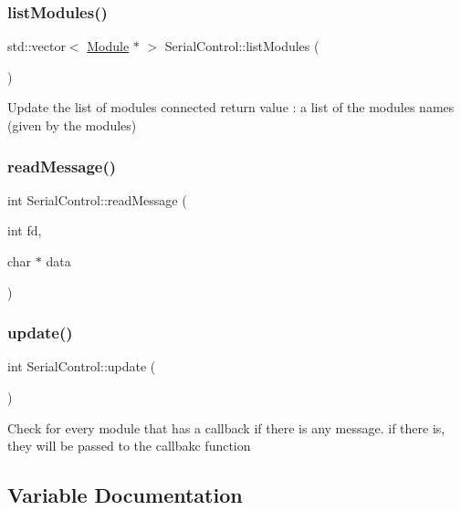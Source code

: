 \subsubsection{\texorpdfstring{listModules()}{listModules()}}
{\footnotesize\ttfamily std\+::vector$<$ \mbox{\hyperlink{classSerialControl_1_1Module}{Module}} $\ast$ $>$ Serial\+Control\+::list\+Modules (\begin{DoxyParamCaption}{ }\end{DoxyParamCaption})}

Update the list of modules connected return value \+: a list of the modules names (given by the modules) \mbox{\label{namespaceSerialControl_a275c08eb10687dadf058e79db3794aba}} 
\subsubsection{\texorpdfstring{readMessage()}{readMessage()}}
{\footnotesize\ttfamily int Serial\+Control\+::read\+Message (\begin{DoxyParamCaption}\item[{int}]{fd,  }\item[{char $\ast$}]{data }\end{DoxyParamCaption})}

\mbox{\label{namespaceSerialControl_ae11022dfef31e0b8d8124629b26476eb}} 
\subsubsection{\texorpdfstring{update()}{update()}}
{\footnotesize\ttfamily int Serial\+Control\+::update (\begin{DoxyParamCaption}{ }\end{DoxyParamCaption})}

Check for every module that has a callback if there is any message. if there is, they will be passed to the callbakc function 

\subsection{Variable Documentation}
\mbox{\label{namespaceSerialControl_a275d9f14ad9b2900481a2f507df60d04}} 
